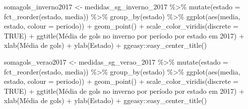 \documentclass[
]{article}
\newenvironment{Shaded}{\begin{snugshade}}{\end{snugshade}}
\newcommand{\AttributeTok}[1]{\textcolor[rgb]{0.77,0.63,0.00}{#1}}
\newcommand{\ConstantTok}[1]{\textcolor[rgb]{0.00,0.00,0.00}{#1}}
\newcommand{\FunctionTok}[1]{\textcolor[rgb]{0.00,0.00,0.00}{#1}}
\newcommand{\NormalTok}[1]{#1}
\newcommand{\OtherTok}[1]{\textcolor[rgb]{0.56,0.35,0.01}{#1}}
\newcommand{\SpecialCharTok}[1]{\textcolor[rgb]{0.00,0.00,0.00}{#1}}
\newcommand{\StringTok}[1]{\textcolor[rgb]{0.31,0.60,0.02}{#1}}
\begin{document}
\begin{Shaded}
\begin{Highlighting}[]
\NormalTok{somagols\_inverno2017 }\OtherTok{\textless{}{-}}\NormalTok{ medidas\_sg\_inverno\_2017 }\SpecialCharTok{\%\textgreater{}\%} \FunctionTok{mutate}\NormalTok{(}\AttributeTok{estado =} \FunctionTok{fct\_reorder}\NormalTok{(estado, media)) }\SpecialCharTok{\%\textgreater{}\%} 
  \FunctionTok{group\_by}\NormalTok{(estado) }\SpecialCharTok{\%\textgreater{}\%}
  \FunctionTok{ggplot}\NormalTok{(}\FunctionTok{aes}\NormalTok{(media, estado, }\AttributeTok{colour =}\NormalTok{ periodo)) }\SpecialCharTok{+} \FunctionTok{geom\_point}\NormalTok{() }\SpecialCharTok{+}
  \FunctionTok{scale\_color\_viridis}\NormalTok{(}\AttributeTok{discrete =} \ConstantTok{TRUE}\NormalTok{) }\SpecialCharTok{+}
  \FunctionTok{ggtitle}\NormalTok{(}\StringTok{\textquotesingle{}Média de gols no inverno por período por estado em 2017\textquotesingle{}}\NormalTok{) }\SpecialCharTok{+} 
  \FunctionTok{xlab}\NormalTok{(}\StringTok{\textquotesingle{}Média de gols\textquotesingle{}}\NormalTok{) }\SpecialCharTok{+} \FunctionTok{ylab}\NormalTok{(}\StringTok{\textquotesingle{}Estado\textquotesingle{}}\NormalTok{) }\SpecialCharTok{+}
\NormalTok{  ggeasy}\SpecialCharTok{::}\FunctionTok{easy\_center\_title}\NormalTok{() }

\NormalTok{somagols\_verao2017 }\OtherTok{\textless{}{-}}\NormalTok{ medidas\_sg\_verao\_2017 }\SpecialCharTok{\%\textgreater{}\%} \FunctionTok{mutate}\NormalTok{(}\AttributeTok{estado =} \FunctionTok{fct\_reorder}\NormalTok{(estado, media)) }\SpecialCharTok{\%\textgreater{}\%} 
  \FunctionTok{group\_by}\NormalTok{(estado) }\SpecialCharTok{\%\textgreater{}\%}
  \FunctionTok{ggplot}\NormalTok{(}\FunctionTok{aes}\NormalTok{(media, estado, }\AttributeTok{colour =}\NormalTok{ periodo)) }\SpecialCharTok{+} \FunctionTok{geom\_point}\NormalTok{() }\SpecialCharTok{+}
  \FunctionTok{scale\_color\_viridis}\NormalTok{(}\AttributeTok{discrete =} \ConstantTok{TRUE}\NormalTok{) }\SpecialCharTok{+}
  \FunctionTok{ggtitle}\NormalTok{(}\StringTok{\textquotesingle{}Média de gols no inverno por período por estado em 2017\textquotesingle{}}\NormalTok{) }\SpecialCharTok{+} 
  \FunctionTok{xlab}\NormalTok{(}\StringTok{\textquotesingle{}Média de gols\textquotesingle{}}\NormalTok{) }\SpecialCharTok{+} \FunctionTok{ylab}\NormalTok{(}\StringTok{\textquotesingle{}Estado\textquotesingle{}}\NormalTok{) }\SpecialCharTok{+}
\NormalTok{  ggeasy}\SpecialCharTok{::}\FunctionTok{easy\_center\_title}\NormalTok{() }



\end{Highlighting}
\end{Shaded}
\end{document}
